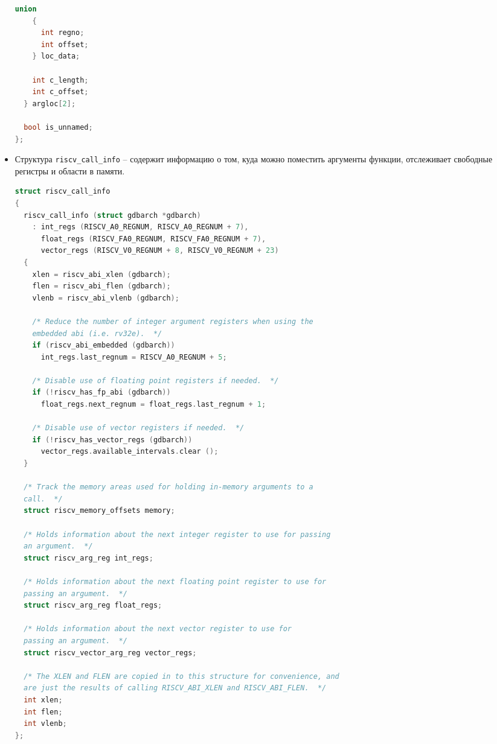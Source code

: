 \begin{itemize}
\begin{samepage}
\begin{lstlisting}[language=C++, caption=Структура riscv\_arg\_info, label=lst:struct:riscv_arg_info]
    union
    {
      int regno;
      int offset;
    } loc_data;

    int c_length;
    int c_offset;
  } argloc[2];

  bool is_unnamed;
};
\end{lstlisting}
\end{samepage}

\item Структура \texttt{riscv\_call\_info} -- содержит информацию о том, куда можно поместить аргументы функции, 
      отслеживает свободные регистры и области в памяти.

\begin{samepage}
\begin{lstlisting}[language=C++, caption=Структура riscv\_call\_info, label=lst:struct:riscv_call_info]
struct riscv_call_info
{
  riscv_call_info (struct gdbarch *gdbarch)
    : int_regs (RISCV_A0_REGNUM, RISCV_A0_REGNUM + 7),
      float_regs (RISCV_FA0_REGNUM, RISCV_FA0_REGNUM + 7),
      vector_regs (RISCV_V0_REGNUM + 8, RISCV_V0_REGNUM + 23)
  {
    xlen = riscv_abi_xlen (gdbarch);
    flen = riscv_abi_flen (gdbarch);
    vlenb = riscv_abi_vlenb (gdbarch);

    /* Reduce the number of integer argument registers when using the
    embedded abi (i.e. rv32e).  */
    if (riscv_abi_embedded (gdbarch))
      int_regs.last_regnum = RISCV_A0_REGNUM + 5;

    /* Disable use of floating point registers if needed.  */
    if (!riscv_has_fp_abi (gdbarch))
      float_regs.next_regnum = float_regs.last_regnum + 1;

    /* Disable use of vector registers if needed.  */
    if (!riscv_has_vector_regs (gdbarch))
      vector_regs.available_intervals.clear ();
  }

  /* Track the memory areas used for holding in-memory arguments to a
  call.  */
  struct riscv_memory_offsets memory;

  /* Holds information about the next integer register to use for passing
  an argument.  */
  struct riscv_arg_reg int_regs;

  /* Holds information about the next floating point register to use for
  passing an argument.  */
  struct riscv_arg_reg float_regs;

  /* Holds information about the next vector register to use for
  passing an argument.  */
  struct riscv_vector_arg_reg vector_regs;

  /* The XLEN and FLEN are copied in to this structure for convenience, and
  are just the results of calling RISCV_ABI_XLEN and RISCV_ABI_FLEN.  */
  int xlen;
  int flen;
  int vlenb;
};
\end{lstlisting}
\end{samepage}

\end{itemize}

\newpage
